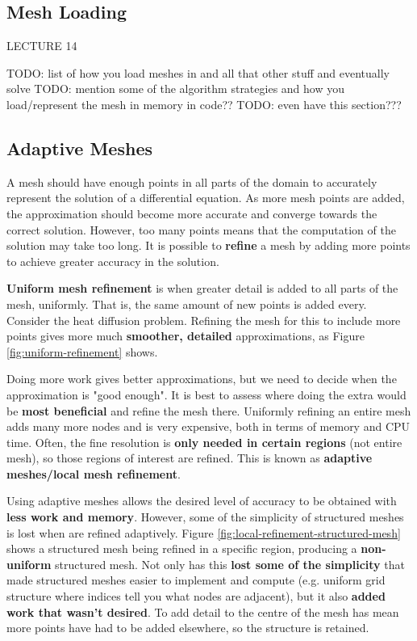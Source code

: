 \documentclass{article}
\begin{document}
\subsection{Mesh Loading}
\label{sec:mesh-loading}

LECTURE 14

TODO: list of how you load meshes in and all that other stuff and eventually solve
TODO: mention some of the algorithm strategies and how you load/represent the mesh in memory in code??
TODO: even have this section???

\subsection{Adaptive Meshes}
\label{sec:adaptive-meshes}

A mesh should have enough points in all parts of the domain to accurately represent the solution of a differential equation. As more mesh points are added, the approximation should become more accurate and converge towards the correct solution. However, too many points means that the computation of the solution may take too long. It is possible to \textbf{refine} a mesh by adding more points to achieve greater accuracy in the solution.

\textbf{Uniform mesh refinement} is when greater detail is added to all parts of the mesh, uniformly. That is, the same amount of new points is added every. Consider the heat diffusion problem. Refining the mesh for this to include more points gives more much \textbf{smoother, detailed} approximations, as Figure \ref{fig:uniform-refinement} shows.

Doing more work gives better approximations, but we need to decide when the approximation is "good enough". It is best to assess where doing the extra would be \textbf{most beneficial} and refine the mesh there. Uniformly refining an entire mesh adds many more nodes and is very expensive, both in terms of memory and CPU time. Often, the fine resolution is \textbf{only needed in certain regions} (not entire mesh), so those regions of interest are refined. This is known as \textbf{adaptive meshes/local mesh refinement}.
 
Using adaptive meshes allows the desired level of accuracy to be obtained with \textbf{less work and memory}. However, some of the simplicity of structured meshes is lost when are refined adaptively. Figure \ref{fig:local-refinement-structured-mesh} shows a structured mesh being refined in a specific region, producing a \textbf{non-uniform} structured mesh. Not only has this \textbf{lost some of the simplicity} that made structured meshes easier to implement and compute (e.g. uniform grid structure where indices tell you what nodes are adjacent), but it also \textbf{added work that wasn't desired}. To add detail to the centre of the mesh has mean more points have had to be added elsewhere, so the structure is retained.
\end{document}

